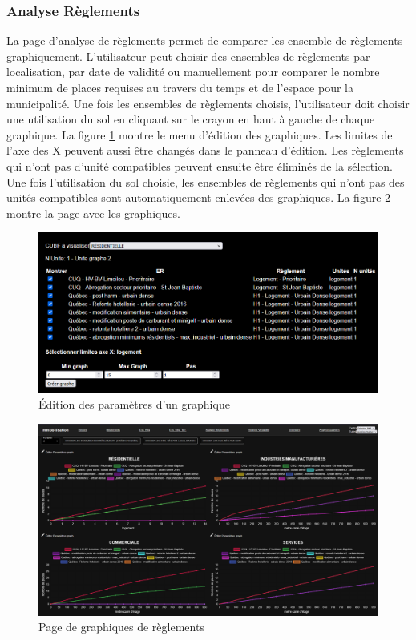\subsubsection{Analyse Règlements}
La page d'analyse de règlements permet de comparer les ensemble de règlements graphiquement. L'utilisateur peut choisir des ensembles de règlements par localisation, par date de validité ou manuellement pour comparer le nombre minimum de places requises au travers du temps et de l'espace pour la municipalité. Une fois les ensembles de règlements choisis, l'utilisateur doit choisir une utilisation du sol en cliquant sur le crayon en haut à gauche de chaque graphique. La figure \ref{fig:params-analyse-ens-reg} montre le menu d'édition des graphiques. Les limites de l'axe des X peuvent aussi être changés dans le panneau d'édition. Les règlements qui n'ont pas d'unité compatibles peuvent ensuite être éliminés de la sélection. Une fois l'utilisation du sol choisie, les ensembles de règlements qui n'ont pas des unités compatibles sont automatiquement enlevées des graphiques. La figure \ref{fig:page-analyse-reg} montre la page avec les graphiques.
\begin{figure}[!h]
    \centering
    \includegraphics[width=0.75\linewidth]{images/AnalyseEnsRegEdition.png}
    \caption{Édition des paramètres d'un graphique}
    \label{fig:params-analyse-ens-reg}
\end{figure}
\begin{landscape}
    \begin{figure}
        \centering
        \includegraphics[width=1\linewidth]{images/PageAnalyseEnsReg.png}
        \caption{Page de graphiques de règlements}
        \label{fig:page-analyse-reg}
    \end{figure}
\end{landscape}

